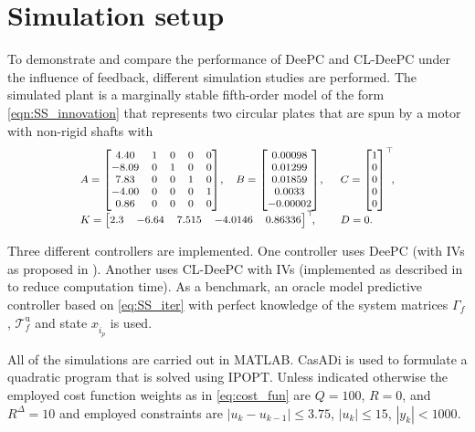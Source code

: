 \section{Simulation setup}
To demonstrate and compare the performance of \ac{DeePC} and \ac{CL-DeePC} under the influence of feedback, different simulation studies are performed. The simulated plant is a marginally stable fifth-order 
model of the form \eqref{eqn:SS_innovation} that represents two circular plates that are spun by a motor with non-rigid shafts with \citep{Favoreel1999b}
\begin{align}\label{eq:SysFavoreel}
\scriptsize
\begin{array}{lll}
    A = \begin{bmatrix}
        4.40 & 1 & 0 & 0 & 0\\
       -8.09 & 0 & 1 & 0 & 0\\
        7.83 & 0 & 0 & 1 & 0\\
       -4.00 & 0 & 0 & 0 & 1\\
        0.86 & 0 & 0 & 0 & 0
    \end{bmatrix}\!,&
    B = \begin{bmatrix}
        0.00098\\
        0.01299\\
        0.01859\\
        0.0033\\
       -0.00002
    \end{bmatrix}\!,&C = \begin{bmatrix}
        1 \\ 0 \\ 0\\ 0\\ 0
    \end{bmatrix}^\top\mkern-7mu,\\
    K = \begin{bmatrix}
        2.3 & -6.64 & 7.515 & -4.0146 & 0.86336
    \end{bmatrix}^\top\mkern-7mu,\span
    &D=0.
\end{array}
\end{align}

Three different controllers are implemented. One controller uses \ac{DeePC} (with \ac{IVs} as proposed in \cite{vanWingerden2022}). Another uses \ac{CL-DeePC} with \ac{IVs} (implemented as described in  to reduce computation time). As a benchmark, an oracle model predictive controller based on \eqref{eq:SS_iter} with perfect knowledge of the system matrices $\Gamma_f$, $\mathcal{T}_f^\mathrm{u}$ and state $x_{\hat{i}_p}$ is used.

All of the simulations are carried out in MATLAB. CasADi is used to formulate a quadratic program that is solved using IPOPT. Unless indicated otherwise the employed cost function weights as in \eqref{eq:cost_fun} are $Q=100$, $R=0$, and $R^\Delta=10$ and employed constraints are $|u_k-u_{k-1}|\leq3.75$, $|u_k|\leq15$, $|y_k|<1000$.